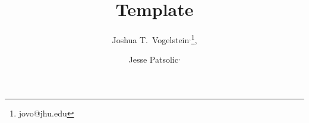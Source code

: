 \documentclass{article}
\title{Template}
\author{%
    Joshua T.~Vogelstein\endnotemark[1]$^,$\endnotemark[2]\thanks{jovo@jhu.edu},
    \and
    Jesse Patsolic\endnotemark[2]$^,$\endnotemark[3]
}
\begin{document}




\clearpage




\theendnotes
\end{document}
